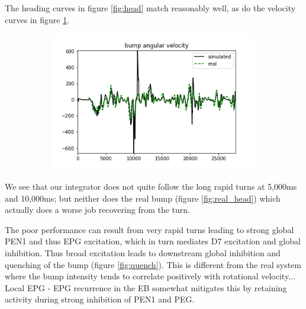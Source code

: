 \documentclass{article}
\begin{document}
\newpage
The heading curves in figure \ref{fig:head}  match reasonably well, as do the velocity curves in figure \ref{fig:vel}.

\begin{figure}[h]
	\centering
	\begin{subfigure}[t]{0.63\linewidth}
		\centering
		\includegraphics[width = 1.0\linewidth, trim={0 0 0 0}, clip=true]{../figures/sim_vel.png}
		\label{fig:vel}	
	\end{subfigure}
\caption{}
\label{fig:model}
\end{figure}

We see that our integrator does not quite follow the long rapid turns at 5,000ms and 10,000ms; but neither does the real bump (figure \ref{fig:real_head}) which actually does a worse job recovering from the turn.

The poor performance can result from very rapid turns leading to strong global PEN1 and thus EPG excitation, which in turn mediates D7 excitation and global inhibition. Thus broad excitation leads to downstream global inhibition and quenching of the bump (figure \ref{fig:quench}). This is different from the real system where the bump intensity tends to correlate positively with rotational velocity...\\
Local EPG - EPG recurrence in the EB somewhat mitigates this by retaining activity during strong inhibition of PEN1 and PEG.
\end{document}
